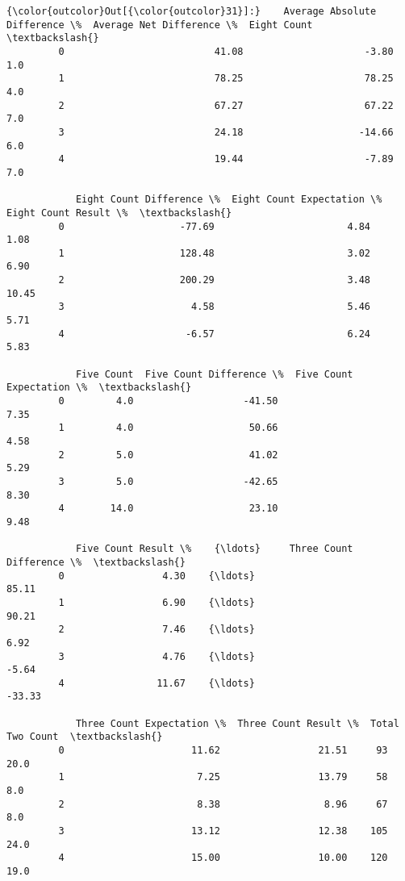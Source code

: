 \documentclass[11pt]{article}
\begin{document}
\begin{Verbatim}[commandchars=\\\{\}]
{\color{outcolor}Out[{\color{outcolor}31}]:}    Average Absolute Difference \%  Average Net Difference \%  Eight Count  \textbackslash{}
         0                          41.08                     -3.80          1.0   
         1                          78.25                     78.25          4.0   
         2                          67.27                     67.22          7.0   
         3                          24.18                    -14.66          6.0   
         4                          19.44                     -7.89          7.0   
         
            Eight Count Difference \%  Eight Count Expectation \%  Eight Count Result \%  \textbackslash{}
         0                    -77.69                       4.84                  1.08   
         1                    128.48                       3.02                  6.90   
         2                    200.29                       3.48                 10.45   
         3                      4.58                       5.46                  5.71   
         4                     -6.57                       6.24                  5.83   
         
            Five Count  Five Count Difference \%  Five Count Expectation \%  \textbackslash{}
         0         4.0                   -41.50                      7.35   
         1         4.0                    50.66                      4.58   
         2         5.0                    41.02                      5.29   
         3         5.0                   -42.65                      8.30   
         4        14.0                    23.10                      9.48   
         
            Five Count Result \%    {\ldots}     Three Count Difference \%  \textbackslash{}
         0                 4.30    {\ldots}                        85.11   
         1                 6.90    {\ldots}                        90.21   
         2                 7.46    {\ldots}                         6.92   
         3                 4.76    {\ldots}                        -5.64   
         4                11.67    {\ldots}                       -33.33   
         
            Three Count Expectation \%  Three Count Result \%  Total  Two Count  \textbackslash{}
         0                      11.62                 21.51     93       20.0   
         1                       7.25                 13.79     58        8.0   
         2                       8.38                  8.96     67        8.0   
         3                      13.12                 12.38    105       24.0   
         4                      15.00                 10.00    120       19.0   
         

\end{Verbatim}
\end{document}
